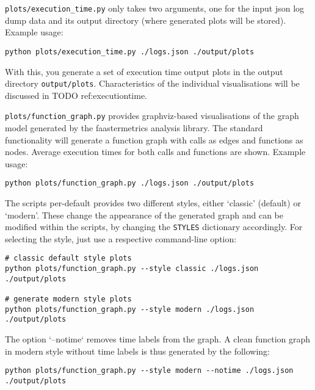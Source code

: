 \documentclass[../main.tex]{subfiles}
\begin{document}
\texttt{plots/execution\_time.py} only takes two arguments, one for the input json 
log dump data and its output directory (where generated plots will be stored).
Example usage:
\begin{tcolorbox}
\begin{verbatim}
python plots/execution_time.py ./logs.json ./output/plots
\end{verbatim}
\end{tcolorbox}\noindent
With this, you generate a set of execution time output plots in the output directory \texttt{output/plots}. 
Characteristics of the individual visualisations will be discussed in TODO ref:executiontime.

\texttt{plots/function\_graph.py} provides graphviz-based visualisations 
of the graph model generated by the faastermetrics analysis library.
The standard functionality will generate a function graph with calls as edges and functions as nodes. 
Average execution times for both calls and functions are shown.
Example usage:
\begin{tcolorbox}
\begin{verbatim}
python plots/function_graph.py ./logs.json ./output/plots
\end{verbatim}
\end{tcolorbox}\noindent


The scripts per-default provides two different styles, either `classic' (default) or `modern'. 
These change the appearance of the generated graph and can be modified within the scripts, 
by changing the \texttt{STYLES} dictionary accordingly. 
For selecting the style, just use a respective command-line option:
\begin{tcolorbox}
\begin{verbatim}
# classic default style plots
python plots/function_graph.py --style classic ./logs.json 
./output/plots

# generate modern style plots
python plots/function_graph.py --style modern ./logs.json 
./output/plots
\end{verbatim}
\end{tcolorbox}

The option `--notime` removes time labels from the graph. 
A clean function graph in modern style without time labels is thus generated by the following:
\begin{tcolorbox}
\begin{verbatim}
python plots/function_graph.py --style modern --notime ./logs.json 
./output/plots
\end{verbatim}
\end{tcolorbox}
\end{document}
